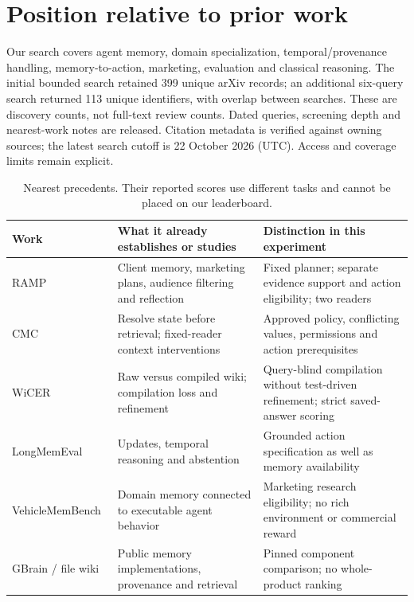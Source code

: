 \section{Position relative to prior work}
Our search covers agent memory, domain specialization, temporal/provenance handling, memory-to-action, marketing, evaluation and classical reasoning. The initial bounded search retained 399 unique arXiv records; an additional six-query search returned 113 unique identifiers, with overlap between searches. These are discovery counts, not full-text review counts. Dated queries, screening depth and nearest-work notes are released. Citation metadata is verified against owning sources; the latest search cutoff is 22 October 2026 (UTC). Access and coverage limits remain explicit.

\begin{table}[t]
\centering\small
\begin{tabularx}{\linewidth}{@{}>{\raggedright\arraybackslash}p{.19\linewidth}>{\raggedright\arraybackslash}X>{\raggedright\arraybackslash}X@{}}
\toprule
Work & What it already establishes or studies & Distinction in this experiment \\
\midrule
RAMP~\citep{p250811120} & Client memory, marketing plans, audience filtering and reflection & Fixed planner; separate evidence support and action eligibility; two readers \\
CMC~\citep{p260932658} & Resolve state before retrieval; fixed-reader context interventions & Approved policy, conflicting values, permissions and action prerequisites \\
WiCER~\citep{p260507068} & Raw versus compiled wiki; compilation loss and refinement & Query-blind compilation without test-driven refinement; strict saved-answer scoring \\
LongMemEval~\citep{p241010813} & Updates, temporal reasoning and abstention & Grounded action specification as well as memory availability \\
VehicleMemBench~\citep{p260323840} & Domain memory connected to executable agent behavior & Marketing research eligibility; no rich environment or commercial reward \\
GBrain / file wiki & Public memory implementations, provenance and retrieval & Pinned component comparison; no whole-product ranking \\
\bottomrule
\end{tabularx}
\caption{Nearest precedents. Their reported scores use different tasks and cannot be placed on our leaderboard.}
\label{tab:related}
\end{table}

